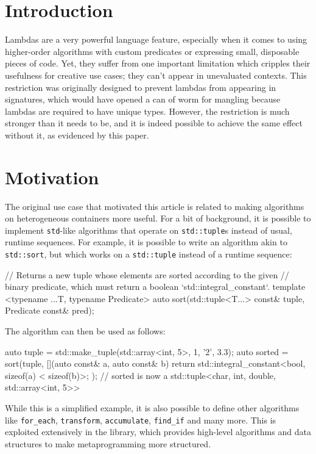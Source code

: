 \documentclass{wg21}
\newcommand{\cc}[1]{\texttt{#1}}
\begin{document}
\section{Introduction}
Lambdas are a very powerful language feature, especially when it comes to using
higher-order algorithms with custom predicates or expressing small, disposable
pieces of code. Yet, they suffer from one important limitation which cripples
their usefulness for creative use cases; they can't appear in unevaluated
contexts. This restriction was originally designed to prevent lambdas from
appearing in signatures, which would have opened a can of worm for mangling
because lambdas are required to have unique types. However, the restriction is
much stronger than it needs to be, and it is indeed possible to achieve the
same effect without it, as evidenced by this paper.


\section{Motivation}
The original use case that motivated this article is related to making algorithms
on heterogeneous containers more useful. For a bit of background, it is possible
to implement \cc{std}-like algorithms that operate on \cc{std::tuple}s instead of
usual, runtime sequences. For example, it is possible to write an algorithm akin
to \cc{std::sort}, but which works on a \cc{std::tuple} instead of a runtime
sequence:

\begin{cpp}
// Returns a new tuple whose elements are sorted according to the given
// binary predicate, which must return a boolean `std::integral_constant`.
template <typename ...T, typename Predicate>
auto sort(std::tuple<T...> const& tuple, Predicate const& pred);
\end{cpp}

The algorithm can then be used as follows:

\begin{cpp}
auto tuple = std::make_tuple(std::array<int, 5>{}, 1, '2', 3.3);
auto sorted = sort(tuple, [](auto const& a, auto const& b) {
  return std::integral_constant<bool, sizeof(a) < sizeof(b)>{};
});
// sorted is now a std::tuple<char, int, double, std::array<int, 5>>
\end{cpp}

While this is a simplified example, it is also possible to define other algorithms
like \cc{for_each}, \cc{transform}, \cc{accumulate}, \cc{find_if} and many more. This
is exploited extensively in the \cite{Boost.Hana} library, which provides high-level
algorithms and data structures to make metaprogramming more structured.
\end{document}
